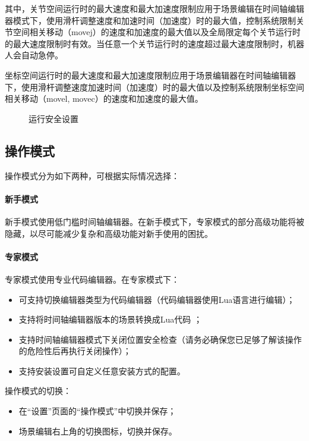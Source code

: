 其中，关节空间运行时的最大速度和最大加速度限制应用于场景编辑在时间轴编辑器模式下，使用滑杆调整速度和加速时间（加速度）时的最大值，控制系统限制关节空间相关移动（movej）的速度和加速度的最大值以及全局限定每个关节运行时的最大速度限制时有效。当任意一个关节运行时的速度超过最大速度限制时，机器人会自动急停。

坐标空间运行时的最大速度和最大加速度限制应用于场景编辑器在时间轴编辑器下，使用滑杆调整速度加速时间（加速度）时的最大值以及控制系统限制坐标空间相关移动（movel, movec）的速度和加速度的最大值。

\begin{figure}[ht]
	\centering
	\color{red}{缺图}
	\caption{运行安全设置}
	\label{fig:运行安全设置}
\end{figure}


\subsection{操作模式}
操作模式分为如下两种，可根据实际情况选择：
\paragraph{新手模式}
新手模式使用低门槛时间轴编辑器。在新手模式下，专家模式的部分高级功能将被隐藏，以尽可能减少复杂和高级功能对新手使用的困扰。
\paragraph{专家模式}
专家模式使用专业代码编辑器。在专家模式下：
\begin{itemize}
\item 可支持切换编辑器类型为代码编辑器（代码编辑器使用Lua语言进行编辑）；
\item 支持将时间轴编辑器版本的场景转换成Lua代码 ；
\item 支持时间轴编辑器模式下关闭位置安全检查（请务必确保您已足够了解该操作的危险性后再执行关闭操作）；
\item 支持安装设置可自定义任意安装方式的配置。
\end{itemize}

操作模式的切换：
\begin{itemize}
	\item 在“设置”页面的“操作模式”中切换并保存；
	\item 场景编辑右上角的切换图标，切换并保存。
\end{itemize}

